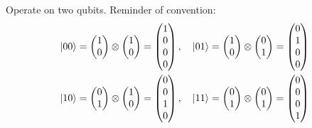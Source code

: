 \documentclass[12pt]{article}
\newcommand{\be}{\begin{equation}}
\newcommand{\ee}{\end{equation}}
\begin{document}
Operate on two qubits. Reminder of convention:
\be
\begin{aligned}
\ket{00} = 	\begin{pmatrix}1\\0\end{pmatrix}\otimes
			\begin{pmatrix}1\\0\end{pmatrix}=
			\begin{pmatrix}1\\0\\0\\0\end{pmatrix},\quad&
\ket{01} = 	\begin{pmatrix}1\\0\end{pmatrix}\otimes
			\begin{pmatrix}0\\1\end{pmatrix}=
			\begin{pmatrix}0\\1\\0\\0\end{pmatrix}\\
\ket{10} = 	\begin{pmatrix}0\\1\end{pmatrix}\otimes
			\begin{pmatrix}1\\0\end{pmatrix}=
			\begin{pmatrix}0\\0\\1\\0\end{pmatrix},\quad&
\ket{11} = 	\begin{pmatrix}0\\1\end{pmatrix}\otimes
			\begin{pmatrix}0\\1\end{pmatrix}=
			\begin{pmatrix}0\\0\\0\\1\end{pmatrix}			
\end{aligned}
\ee
\end{document}
